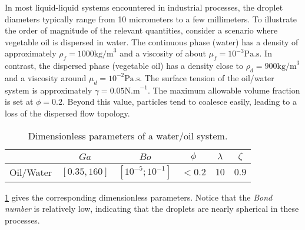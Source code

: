 In most liquid-liquid systems encountered in industrial processes, the droplet diameters typically range from 10 micrometers to a few millimeters. To illustrate the order of magnitude of the relevant quantities, consider a scenario where vegetable oil is dispersed in water. The continuous phase (water) has a density of approximately $\rho_f = 1000 \text{kg/m}^3$ and a viscosity of about $\mu_f = 10^{-3} \text{Pa.s}$. In contrast, the dispersed phase (vegetable oil) has a density close to $\rho_d = 900 \text{kg/m}^3$ and a viscosity around $\mu_d = 10^{-2} \text{Pa.s}$.
The surface tension of the oil/water system is approximately $\gamma = 0.05 \text{N.m}^{-1}$. The maximum allowable volume fraction is set at $\phi = 0.2$. Beyond this value, particles tend to coalesce easily, leading to a loss of the dispersed flow topology.%
\begin{table}[h!]
    \centering
    \caption{Dimensionless parameters of a water/oil system.}
    \begin{tabular}{|c||c|c|c|c|c|}
        \hline&$Ga$&$Bo$&$\phi$&$\lambda$&$\zeta$\\ \hline
        \hline Oil/Water&$[0.35,160]$&$[10^{-5};10^{-1}]$&$<0.2$&$10$&$0.9$\\ \hline
    \end{tabular}
    \label{tab:parameters_exp}
\end{table}
\ref{tab:parameters_exp} gives the corresponding dimensionless parameters.  
Notice that the \textit{Bond number} is relatively low, indicating that the droplets are nearly spherical in these processes.

